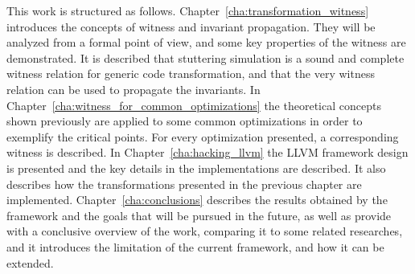 This work is structured as follows. Chapter~\ref{cha:transformation_witness} introduces the concepts of witness and invariant propagation. They will be analyzed from a formal point of view, and some key properties of the witness are demonstrated. It is described that stuttering simulation is a sound and complete witness relation for generic code transformation, and that the very witness relation can be used to propagate the invariants. In Chapter~\ref{cha:witness_for_common_optimizations} the theoretical concepts shown previously are applied to some common optimizations in order to exemplify the critical points. For every optimization presented, a corresponding witness is described. In Chapter~\ref{cha:hacking_llvm} the LLVM framework design is presented and the key details in the implementations are described. It also describes how the transformations presented in the previous chapter are implemented. Chapter~\ref{cha:conclusions} describes the results obtained by the framework and the goals that will be pursued in the future, as well as provide with a conclusive overview of the work, comparing it to some related researches, and it introduces the limitation of the current framework, and how it can be extended.

